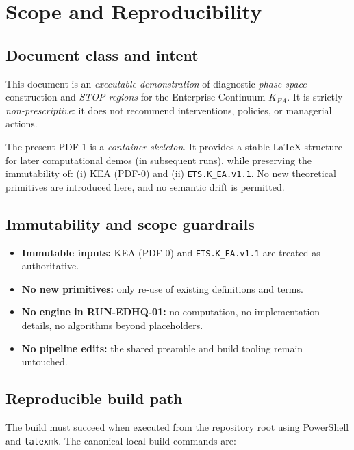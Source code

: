 
\section{Scope and Reproducibility}
\label{sec:scope-repro}

\subsection{Document class and intent}
This document is an \emph{executable demonstration} of diagnostic \emph{phase space}
construction and \emph{STOP regions} for the Enterprise Continuum \(K_{EA}\).
It is strictly \emph{non-prescriptive}: it does not recommend interventions, policies,
or managerial actions.

The present PDF-1 is a \emph{container skeleton}. It provides a stable LaTeX structure
for later computational demos (in subsequent runs), while preserving the immutability of:
(i) KEA (PDF-0) and (ii) \texttt{ETS.K\_EA.v1.1}.
No new theoretical primitives are introduced here, and no semantic drift is permitted.

\subsection{Immutability and scope guardrails}
\begin{itemize}
  \item \textbf{Immutable inputs:} KEA (PDF-0) and \texttt{ETS.K\_EA.v1.1} are treated as authoritative.
  \item \textbf{No new primitives:} only re-use of existing definitions and terms.
  \item \textbf{No engine in RUN-EDHQ-01:} no computation, no implementation details, no algorithms beyond placeholders.
  \item \textbf{No pipeline edits:} the shared preamble and build tooling remain untouched.
\end{itemize}

\subsection{Reproducible build path}
The build must succeed when executed from the repository root using PowerShell and \texttt{latexmk}.
The canonical local build commands are:

